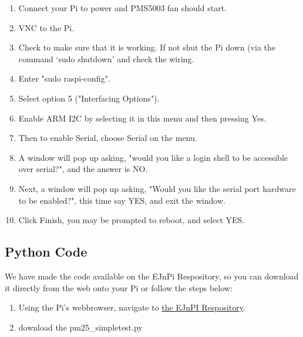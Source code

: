 \documentclass{article}
\begin{document}
\begin{enumerate}
  \item Connect your Pi to power and PMS5003 fan should start.
  \item VNC to the Pi.
  \item Check to make sure that it is working. If not shut the Pi down (via the command `sudo shutdown' and check the wiring. 

\item Enter "sudo raspi-config".

\item Select option 5 ("Interfacing Options").

\item Enable ARM I2C by selecting it in this menu and then pressing Yes.

\item Then to enable Serial, choose Serial on the menu. 

\item A window will pop up asking, "would you like a login shell to be accessible over serial?", and the answer is NO.

\item Next, a window will pop up asking, "Would you like the serial port hardware to be enabled?", this time say YES, and exit the window.

\item Click Finish, you may be prompted to reboot, and select YES.

\end{enumerate}

\subsection{Python Code}

We have made the code available on the EJnPi Respository, so you can download it directly from the web onto your Pi or follow the steps below:

\begin{enumerate}

\item Using the Pi's webbrowser, navigate to \href{https://github.com/marclos/EJnPi/tree/master/code}{the EJnPI Respository}.

\item download the pm25\_simpletest.py



\end{enumerate}
\end{document}
